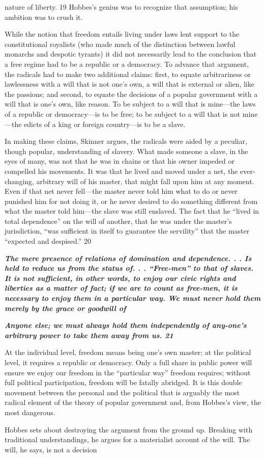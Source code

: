 nature of liberty. {\color{blue} 19 } Hobbes’s genius was to recognize that assumption; his ambition was to crush it.{\par} While the notion that freedom entails living under laws lent support to the constitutional royalists (who made much of the distinction between lawful monarchs and despotic tyrants) it did not necessarily lead to the conclusion that a free regime had to be a republic or a democracy. To advance that argument, the radicals had to make two additional claims: first, to equate arbitrariness or lawlessness with a will that is not one’s own, a will that is external or alien, like the passions; and second, to equate the decisions of a popular government with a will that is one’s own, like reason. To be subject to a will that is mine—the laws of a republic or democracy—is to be free; to be subject to a will that is not mine—the edicts of a king or foreign country—is to be a slave.{\par} In making these claims, Skinner argues, the radicals were aided by a peculiar, though popular, understanding of slavery. What made someone a slave, in the eyes of many, was not that he was in chains or that his owner impeded or compelled his movements. It was that he lived and moved under a net, the ever-changing, arbitrary will of his master, that might fall upon him at any moment. Even if that net never fell—the master never told him what to do or never punished him for not doing it, or he never desired to do something different from what the master told him—the slave was still enslaved. The fact that he “lived in total dependence” on the will of another, that he was under the master’s jurisdiction, “was sufficient in itself to guarantee the servility” that the master “expected and despised.” 20{\par} {\textbf{\textit{The mere presence of relations of domination and dependence. . . Is held to reduce us from the status of. . . “Free-men” to that of slaves. It is not sufficient, in other words, to enjoy our civic rights and liberties as a matter of fact; if we are to count as free-men, it is necessary to enjoy them in a particular way. We must never hold them merely by the grace or goodwill of} } }{\par} {\par} {\textbf{\textit{Anyone else; we must always hold them independently of any-one’s arbitrary power to take them away from us. {\color{blue} 21 } } } }{\par} At the individual level, freedom means being one’s own master; at the political level, it requires a republic or democracy. Only a full share in public power will ensure we enjoy our freedom in the “particular way” freedom requires; without full political participation, freedom will be fatally abridged. It is this double movement between the personal and the political that is arguably the most radical element of the theory of popular government and, from Hobbes’s view, the most dangerous.{\par} Hobbes sets about destroying the argument from the ground up. Breaking with traditional understandings, he argues for a materialist account of the will. The will, he says, is not a decision 